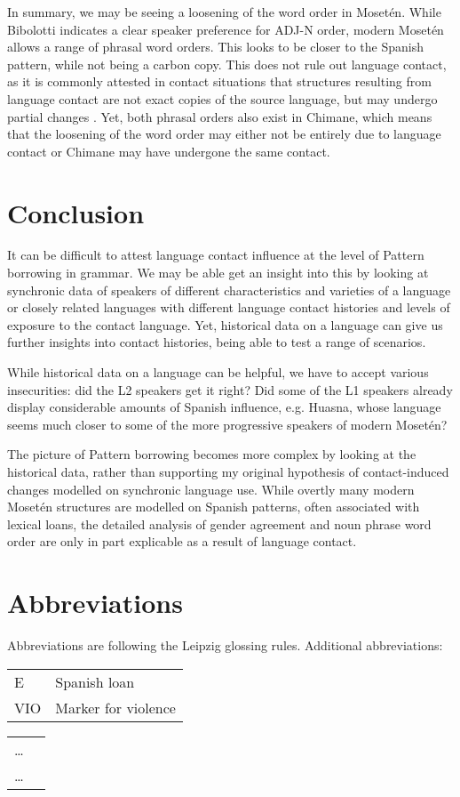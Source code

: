 \documentclass[output=paper,colorlinks,citecolor=brown
]{langscibook}
\begin{document}
In summary, we may be seeing a loosening of the word order in Mosetén. While Bibolotti indicates a clear speaker preference for ADJ-N order, modern Mosetén allows a range of phrasal word orders. This looks to be closer to the Spanish pattern, while not being a carbon copy. This does not rule out language contact, as it is commonly attested in contact situations that structures resulting from language contact are not exact copies of the source language, but may undergo partial changes \citep{heine2005language}. Yet, both phrasal orders also exist in Chimane, which means that the loosening of the word order may either not be entirely due to language contact or Chimane may have undergone the same contact.


\section{Conclusion}
It can be difficult to attest language contact influence at the level of Pattern borrowing in grammar. We may be able get an insight into this by looking at synchronic data of speakers of different characteristics and varieties of a language or closely related languages with different language contact histories and levels of exposure to the contact language. Yet, historical data on a language can give us further insights into contact histories, being able to test a range of scenarios.

While historical data on a language can be helpful, we have to accept various insecurities: did the L2 speakers get it right? Did some of the L1 speakers already display considerable amounts of Spanish influence, e.g. Huasna, whose language seems much closer to some of the more progressive speakers of modern Mosetén?

The picture of Pattern borrowing becomes more complex by looking at the historical data, rather than supporting my original hypothesis of contact-induced changes modelled on synchronic language use. While overtly many modern Mo\-setén structures are modelled on Spanish patterns, often associated with lexical loans, the detailed analysis of gender agreement and noun phrase word order are only in part explicable as a result of language contact. 



\section*{Abbreviations}
Abbreviations are following the Leipzig glossing rules. Additional abbreviations:
\begin{tabularx}{.5\textwidth}{@{}lQ@{}}
E & Spanish loan\\
VIO & Marker for violence\\ 
\end{tabularx}%
\begin{tabularx}{.5\textwidth}{@{}lQ@{}}
 \ldots  & \\
 \ldots  & \\
\end{tabularx}

\sloppy
\printbibliography[heading=subbibliography,notkeyword=this]
\end{document}
